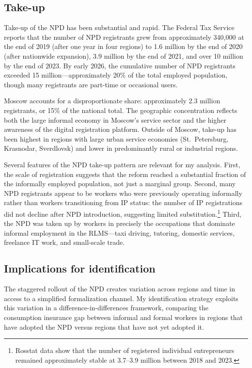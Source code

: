 \documentclass[12pt]{article}
\begin{document}
\subsection{Take-up}

Take-up of the NPD has been substantial and rapid. The Federal Tax Service reports that the number of NPD registrants grew from approximately 340,000 at the end of 2019 (after one year in four regions) to 1.6 million by the end of 2020 (after nationwide expansion), 3.9 million by the end of 2021, and over 10 million by the end of 2023. By early 2026, the cumulative number of NPD registrants exceeded 15 million---approximately 20\% of the total employed population, though many registrants are part-time or occasional users.

Moscow accounts for a disproportionate share: approximately 2.3 million registrants, or 15\% of the national total. The geographic concentration reflects both the large informal economy in Moscow's service sector and the higher awareness of the digital registration platform. Outside of Moscow, take-up has been highest in regions with large urban service economies (St.~Petersburg, Krasnodar, Sverdlovsk) and lower in predominantly rural or industrial regions.

Several features of the NPD take-up pattern are relevant for my analysis. First, the scale of registration suggests that the reform reached a substantial fraction of the informally employed population, not just a marginal group. Second, many NPD registrants appear to be workers who were previously operating informally rather than workers transitioning from IP status: the number of IP registrations did not decline after NPD introduction, suggesting limited substitution.\footnote{Rosstat data show that the number of registered individual entrepreneurs remained approximately stable at 3.7--3.9 million between 2018 and 2023.} Third, the NPD was taken up by workers in precisely the occupations that dominate informal employment in the RLMS---taxi driving, tutoring, domestic services, freelance IT work, and small-scale trade.

\subsection{Implications for identification}

The staggered rollout of the NPD creates variation across regions and time in access to a simplified formalization channel. My identification strategy exploits this variation in a difference-in-differences framework, comparing the consumption insurance gap between informal and formal workers in regions that have adopted the NPD versus regions that have not yet adopted it.
\end{document}
